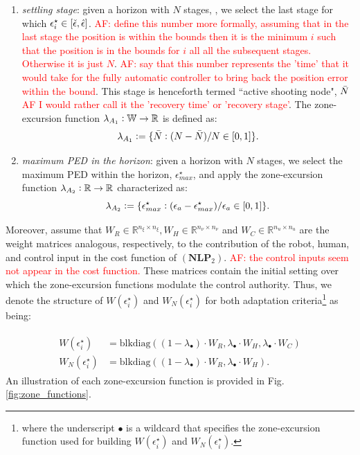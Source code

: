 \begin{enumerate}[label=(\subscript{A}{{\arabic*}}),leftmargin=40pt]
	\item 	 \textit{settling stage}: given a horizon with $N$ stages, , we select the last stage for which $\epsilon^\star_i \in [\check{\epsilon},\Hat{\epsilon}]$. \textcolor{red}{AF: define this number more formally, assuming that in the last stage the position is within the bounds then it is the minimum $i$ such that the position is in the bounds for $i$ all all the subsequent stages. Otherwise it is just $N$}.
	\textcolor{red}{AF: say that this number represents the 'time' that it would take for the fully automatic controller to bring back the position error within the bound}. 
	This stage is henceforth termed ``active shooting node", $\Bar{N}$ 	\textcolor{red}{AF I would rather call it the 'recovery time' or 'recovery stage'}. The zone-excursion function $\lambda_{A_1} \vcentcolon \mathbb{W} \rightarrow \mathbb{R}$ is defined as:
		\begin{equation}\label{eq:lambda1}%
			\lambda_{A_1} \vcentcolon = \{ \Bar{N} \vcentcolon (N-\Bar{N})/N \in [0,1] \}.
		\end{equation}
	\item \textit{maximum PED in the horizon}: given a horizon with $N$ stages, we select the maximum PED within the horizon, $\epsilon^\star_{max}$, and apply the zone-excursion function $\lambda_{A_2} \vcentcolon \mathbb{R} \rightarrow \mathbb{R}$ characterized as:
		\begin{equation}\label{eq:lambda2}%
			\lambda_{A_2} \vcentcolon = \{\epsilon^\star_{max} \vcentcolon (\epsilon_a-\epsilon^\star_{max})/\epsilon_a \in [0,1] \}.
		\end{equation}
\end{enumerate}

Moreover, assume that $W_R \in \mathbb{R}^{n_{\xi} \times n_{\xi}}, W_H \in \mathbb{R}^{n_{\nu} \times n_{\nu}}$ and $W_C \in \mathbb{R}^{n_u \times n_u}$ are the weight matrices analogous, respectively, to the contribution of the robot, human, and control input in the cost function of $(\mathbf{NLP}_2)$. 
	\textcolor{red}{AF: the control inputs seem not appear in the cost function.}
These matrices contain the initial setting over which the zone-excursion functions modulate the control authority. Thus, we denote the structure of $W(\epsilon_i^\star)$ and ${W}_N(\epsilon_i^\star)$ for both adaptation criteria\footnote{where the underscript $\bullet$ is a wildcard that specifies the zone-excursion function used for building $W(\epsilon_i^\star)$ and ${W}_N(\epsilon_i^\star)$.} as being:

\begin{eqnarray}
\begin{aligned}
	W(\epsilon_i^\star) & =  \text{blkdiag}((1-\lambda_{\bullet})\cdot W_R, \lambda_{\bullet} \cdot W_H, \lambda_{\bullet} \cdot W_C)\\
	{W}_N(\epsilon_i^\star) & = \text{blkdiag}((1-\lambda_{\bullet})\cdot W_R, \lambda_{\bullet} \cdot W_H).\label{eq:weight_matrices}
\end{aligned}
\end{eqnarray}
An illustration of each zone-excursion function is provided in Fig. \ref{fig:zone_functions}.